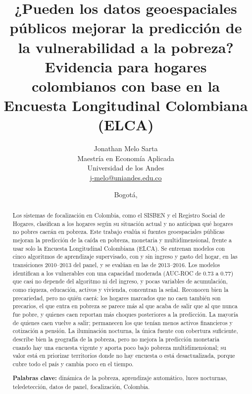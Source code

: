 \documentclass[12pt, letterpaper]{article}
\title{
  \vspace{-2.5em}%
  \textbf{¿Pueden los datos geoespaciales públicos mejorar la
  predicción de la vulnerabilidad a la pobreza?} \\[6pt]
  \large Evidencia para hogares colombianos con base en
  la Encuesta Longitudinal Colombiana (ELCA)
}
\author{
  Jonathan Melo Sarta \\
  \small Maestría en Economía Aplicada \\
  \small Universidad de los Andes \\
  \small \href{mailto:j-melo@uniandes.edu.co}{j-melo@uniandes.edu.co}
}
\date{Bogotá, \the\year}
\begin{document}

\maketitle
\thispagestyle{empty}

\begin{abstract}
\noindent
Los sistemas de focalización en Colombia, como el SISBEN y el Registro
Social de Hogares, clasifican a los hogares según su situación actual y no
anticipan qué hogares no pobres caerán en pobreza. Este trabajo evalúa si
fuentes geoespaciales públicas mejoran la predicción de la caída en
pobreza, monetaria y multidimensional, frente a usar solo la Encuesta
Longitudinal Colombiana (ELCA). Se entrenan modelos con cinco algoritmos
de aprendizaje supervisado, con y sin ingreso y gasto del hogar, en las
transiciones 2010--2013 del panel, y se evalúan en las de 2013--2016. Los
modelos identifican a los vulnerables con una capacidad moderada (AUC-ROC
de 0.73 a 0.77) que casi no depende del algoritmo ni del ingreso, y pocas
variables de acumulación, como riqueza, educación, activos y vivienda,
concentran la señal. Reconocen bien la precariedad, pero no quién caerá:
los hogares marcados que no caen también son precarios, el que entra en
pobreza se parece más al que acaba de salir que al que nunca fue pobre, y
quienes caen reportan más choques posteriores a la predicción. La mayoría
de quienes caen vuelve a salir; permanecen los que tenían menos activos
financieros y cotización a pensión. La iluminación nocturna, la única
fuente con cobertura suficiente, describe bien la geografía de la
pobreza, pero no mejora la predicción monetaria cuando hay una encuesta
vigente y aporta poco bajo pobreza multidimensional; su valor está en
priorizar territorios donde no hay encuesta o está desactualizada, porque
cubre todo el país y cambia poco en el tiempo.

\textbf{Palabras clave:} dinámica de la pobreza, aprendizaje automático,
luces nocturnas, teledetección, datos de panel, focalización, Colombia.

\end{abstract}

\newpage

\end{document}
